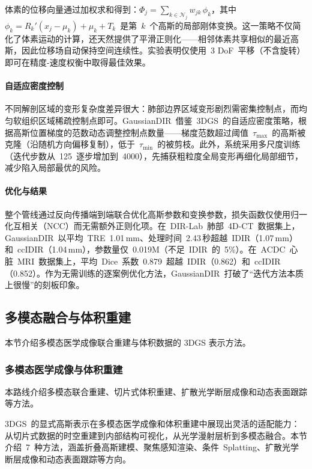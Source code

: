 体素的位移向量通过加权求和得到：$\Phi_j = \sum_{k \in \mathcal{N}_j} w_{jk}\,\phi_k$，其中~$\phi_k = R_k'(x_j - \mu_k) + \mu_k + T_k$~是第~$k$~个高斯的局部刚体变换。这一策略不仅简化了体素运动的计算，还天然提供了平滑正则化——相邻体素共享相似的最近高斯，因此位移场自动保持空间连续性。实验表明仅使用~3 DoF~平移（不含旋转）即可在精度-速度权衡中取得最佳效果。

\paragraph{自适应密度控制}
不同解剖区域的变形复杂度差异很大：肺部边界区域变形剧烈需密集控制点，而均匀软组织区域稀疏控制点即可。GaussianDIR~借鉴~3DGS~的自适应密度策略，根据高斯位置梯度的范数动态调整控制点数量——梯度范数超过阈值~$\tau_{\max}$~的高斯被克隆（沿随机方向偏移复制），低于~$\tau_{\min}$~的被剪枝。此外，系统采用多尺度训练（迭代步数从~125~逐步增加到~4000），先捕获粗粒度全局变形再细化局部细节，减少陷入局部最优的风险。

\paragraph{优化与结果}
整个管线通过反向传播端到端联合优化高斯参数和变换参数，损失函数仅使用归一化互相关（NCC）而无需额外正则化项。在~DIR-Lab~肺部~4D-CT~数据集上，GaussianDIR~以平均~TRE~1.01\,mm、处理时间~2.43\,秒超越~IDIR（1.07\,mm）和~ccIDIR（1.04\,mm），参数量仅~0.019M（不足~IDIR~的~5\%）。在~ACDC~心脏~MRI~数据集上，平均~Dice~系数~0.879~超越~IDIR（0.862）和~ccIDIR（0.852）。作为无需训练的逐案例优化方法，GaussianDIR~打破了``迭代方法本质上很慢''的刻板印象。

\subsection{多模态融合与体积重建}
\label{ss:19_9}

本节介绍多模态医学成像联合重建与体积数据的 3DGS 表示方法。

\subsubsection{多模态医学成像与体积重建}

本路线介绍多模态联合重建、切片式体积重建、扩散光学断层成像和动态表面跟踪等方法。

3DGS~的显式高斯表示在多模态医学成像和体积重建中展现出灵活的适配能力：从切片式数据的时空重建到内部结构可视化，从光学漫射层析到多模态融合。本节介绍~7~种方法，涵盖折叠高斯建模、聚焦感知渲染、条件~Splatting、扩散光学断层成像和动态表面跟踪等方向。

